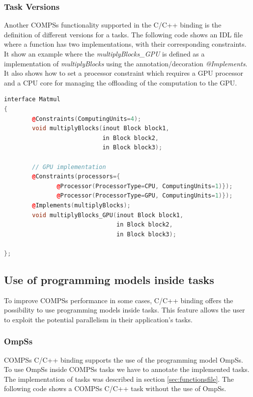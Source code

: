 \subsubsection{Task Versions}
Another COMPSs functionality supported in the C/C++ binding is the definition of different versions for a tasks. 
The following code shows an IDL file where a function has two implementations, with their corresponding constraints. 
It show an example where the \textit{multiplyBlocks\_GPU} is defined as a implementation of \textit{multiplyBlocks} using the annotation/decoration \textit{@Implements}. 
It also shows how to set a processor constraint which requires a GPU processor and a CPU core for managing the offloading of the computation to the GPU. 
\begin{lstlisting}[language=C++]
interface Matmul
{
        @Constraints(ComputingUnits=4);
        void multiplyBlocks(inout Block block1, 
                            in Block block2,
                            in Block block3);

        // GPU implementation 
        @Constraints(processors={
               @Processor(ProcessorType=CPU, ComputingUnits=1)});
               @Processor(ProcessorType=GPU, ComputingUnits=1)});
        @Implements(multiplyBlocks);
        void multiplyBlocks_GPU(inout Block block1,
                                in Block block2, 
                                in Block block3); 
                          
};
\end{lstlisting}

\subsection{Use of programming models inside tasks}

To improve COMPSs performance in some cases, C/C++ binding offers the possibility to use programming models inside tasks. This feature allows the user to exploit the potential parallelism in their application's tasks.

\subsubsection{OmpSs}
\label{sec:ompss}

COMPSs C/C++ binding supports the use of the programming model OmpSs. To use OmpSs inside COMPSs tasks we have to annotate the implemented tasks. The implementation of tasks was described in section \ref{sec:functionsfile}. The following code shows a COMPSs C/C++ task without the use of OmpSs.


